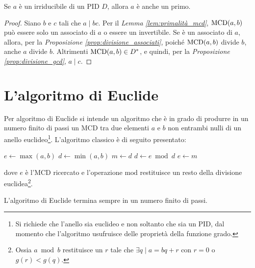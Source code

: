 \begin{theorem}
    \label{th:irriducibili_primi}
    Se $a$ è un irriducibile di un PID $D$, allora $a$ è anche un primo.
\end{theorem}

\begin{proof}
    Siano $b$ e $c$ tali che $a \mid bc$. Per il \textit{Lemma \ref{lem:primalità_mcd}},
    $\operatorname{MCD}(a,b)$ può essere solo un associato di $a$ o essere un invertibile. Se è
    un associato di $a$, allora, per la \textit{Proposizione \ref{prop:divisione_associati}}, poiché $\operatorname{MCD}(a,b)$ divide $b$, anche $a$ divide $b$.
    Altrimenti $\operatorname{MCD}(a,b) \in D^*$, e quindi, per la \textit{Proposizione \ref{prop:divisione_gcd}}, $a \mid c$.
\end{proof}

\section{L'algoritmo di Euclide}

Per algoritmo di Euclide si intende un algoritmo che è in grado di
produrre in un numero finito di passi un MCD tra due elementi
$a$ e $b$ non entrambi nulli di un anello euclideo\footnote{Si richiede che l'anello sia
    euclideo e non soltanto che sia un PID, dal momento che l'algoritmo
    usufruisce delle proprietà della funzione grado.}. L'algoritmo
classico è di seguito presentato:

\newpage

\begin{algorithm}
    $e \gets \max(a,b)$\;
    $d \gets \min(a,b)$\;
    \BlankLine\BlankLine
    {
        $m \gets d$\;
        $d \gets e \bmod d$\;
        $e \gets m$\;
    }
\end{algorithm}

dove $e$ è l'MCD ricercato e l'operazione $\mathrm{mod}$ restituisce un resto della
divisione euclidea\footnote{Ossia $a \bmod b$ restituisce un $r$ tale che $\exists q
        \mid a = bq+r$ con $r=0$ o $g(r)<g(q)$.}.

\begin{lemma}
    \label{lem:euclide_finito}
    L'algoritmo di Euclide termina sempre in un numero finito di passi.
\end{lemma}


